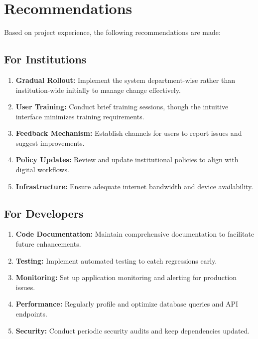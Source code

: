 \section{Recommendations}

Based on project experience, the following recommendations are made:

\subsection{For Institutions}

\begin{enumerate}
\item \textbf{Gradual Rollout:} Implement the system department-wise rather than institution-wide initially to manage change effectively.

\item \textbf{User Training:} Conduct brief training sessions, though the intuitive interface minimizes training requirements.

\item \textbf{Feedback Mechanism:} Establish channels for users to report issues and suggest improvements.

\item \textbf{Policy Updates:} Review and update institutional policies to align with digital workflows.

\item \textbf{Infrastructure:} Ensure adequate internet bandwidth and device availability.
\end{enumerate}

\subsection{For Developers}

\begin{enumerate}
\item \textbf{Code Documentation:} Maintain comprehensive documentation to facilitate future enhancements.

\item \textbf{Testing:} Implement automated testing to catch regressions early.

\item \textbf{Monitoring:} Set up application monitoring and alerting for production issues.

\item \textbf{Performance:} Regularly profile and optimize database queries and API endpoints.

\item \textbf{Security:} Conduct periodic security audits and keep dependencies updated.
\end{enumerate}

